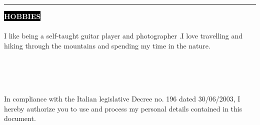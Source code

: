 \documentclass[10pt,A4]{article}
\newcounter{a}
\newcounter{b}
\newcounter{c}
\newcommand{\cvsection}[1] {
	\textcolor{white}{\MakeUppercase{\textbf{#1}}}
}
\newcommand{\cvsect}[1]{
	\colorbox{black}{{\cvsection{#1}}}\\\\%
}
\begin{document}
	\hspace{0cm}
	\begin{minipage}[t]{0.8\textwidth}\hrule height 0pt width 0pt%
		\cvsect{Hobbies}
		I like being a self-taught guitar player and photographer .I love travelling and hiking through the mountains and spending my time in the nature.
	\end{minipage}%
	\hspace{2cm}
	\\
	\\
	\\
	\begin{footnotesize}
			In compliance with the Italian legislative Decree no. 196 dated 30/06/2003, I hereby authorize you to use and process my personal details contained in this document.
	\end{footnotesize}
\end{document}
